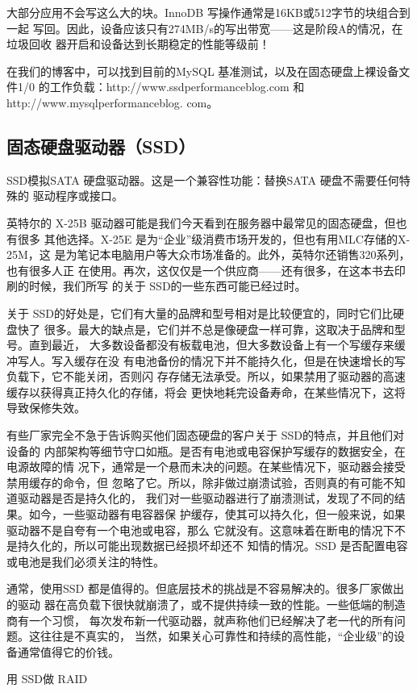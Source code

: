 大部分应用不会写这么大的块。InnoDB 写操作通常是16KB或512字节的块组合到一起
写回。因此，设备应该只有274MB/s的写出带宽——这是阶段A的情况，在垃圾回收
器开启和设备达到长期稳定的性能等级前！

在我们的博客中，可以找到目前的MySQL 基准测试，以及在固态硬盘上裸设备文件1/0
的工作负载：http://www.ssdperformanceblog.com 和 http://www.mysqlperformanceblog.
com。

\subsection{固态硬盘驱动器（SSD）}
SSD模拟SATA 硬盘驱动器。这是一个兼容性功能：替换SATA 硬盘不需要任何特殊的
驱动程序或接口。

英特尔的 X-25B 驱动器可能是我们今天看到在服务器中最常见的固态硬盘，但也有很多
其他选择。X-25E 是为“企业”级消费市场开发的，但也有用MLC存储的X-25M，这
是为笔记本电脑用户等大众市场准备的。此外，英特尔还销售320系列，也有很多人正
在使用。再次，这仅仅是一个供应商——还有很多，在这本书去印刷的时候，我们所写
的关于 SSD的一些东西可能已经过时。

关于 SSD的好处是，它们有大量的品牌和型号相对是比较便宜的，同时它们比硬盘快了
很多。最大的缺点是，它们并不总是像硬盘一样可靠，这取决于品牌和型号。直到最近，
大多数设备都没有板载电池，但大多数设备上有一个写缓存来缓冲写人。写入缓存在没
有电池备份的情况下并不能持久化，但是在快速增长的写负载下，它不能关闭，否则闪
存存储无法承受。所以，如果禁用了驱动器的高速缓存以获得真正持久化的存储，将会
更快地耗完设备寿命，在某些情况下，这将导致保修失效。

有些厂家完全不急于告诉购买他们固态硬盘的客户关于 SSD的特点，并且他们对设备的
内部架构等细节守口如瓶。是否有电池或电容保护写缓存的数据安全，在电源故障的情
况下，通常是一个悬而未决的问题。在某些情况下，驱动器会接受禁用缓存的命令，但
忽略了它。所以，除非做过崩溃试验，否则真的有可能不知道驱动器是否是持久化的，
我们对一些驱动器进行了崩溃测试，发现了不同的结果。如今，一些驱动器有电容器保
护缓存，使其可以持久化，但一般来说，如果驱动器不是自夸有一个电池或电容，那么
它就没有。这意味着在断电的情况下不是持久化的，所以可能出现数据已经损坏却还不
知情的情况。SSD 是否配置电容或电池是我们必须关注的特性。

通常，使用SSD 都是值得的。但底层技术的挑战是不容易解决的。很多厂家做出的驱动
器在高负载下很快就崩溃了，或不提供持续一致的性能。一些低端的制造商有一个习惯，
每次发布新一代驱动器，就声称他们已经解决了老一代的所有问题。这往往是不真实的，
当然，如果关心可靠性和持续的高性能，“企业级”的设备通常值得它的价钱。

用 SSD做 RAID

